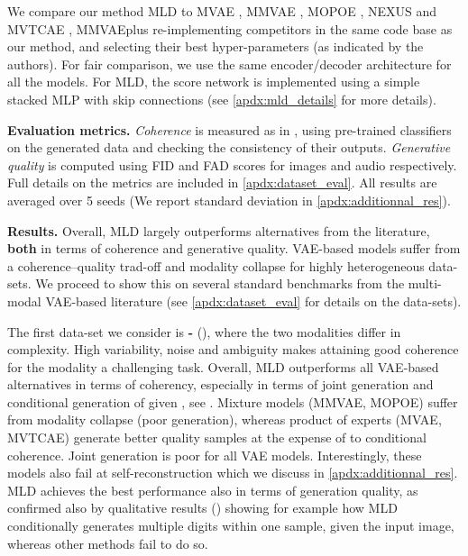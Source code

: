

We compare our method \gls{MLD} to \gls{MVAE} \cite{mvaeWu2018}, \gls{MMVAE} \cite{mmvaeShi2019}, \gls{MOPOE} \cite{sutter2021generalized}, \gls{NEXUS} \cite{Vasco2022} and \gls{MVTCAE} \cite{tcmvaehwang21}, \gls{MMVAEplus} \cite{palumbo2023mmvae} re-implementing competitors in the same code base as our method, and selecting their best hyper-parameters (as indicated by the authors). For fair comparison, we use the same encoder/decoder architecture for all the models. For \gls{MLD}, the score network is implemented using a simple stacked \gls{MLP} with skip connections (see \ref{apdx:mld_details} for more details).



\noindent \textbf{Evaluation metrics.} \textit{Coherence} is measured as in \cite{mmvaeShi2019, sutter2021generalized, palumbo2023mmvae}, using pre-trained classifiers on the generated data and checking the consistency of their outputs. \textit{Generative quality} is computed using \gls{FID} \cite{fid} and \gls{FAD} \cite{fad} scores for images and audio respectively. Full details on the metrics are included in \ref{apdx:dataset_eval}. All results are averaged over 5 seeds (We report standard deviation in \ref{apdx:additionnal_res}).





\noindent \textbf{Results.} Overall, \gls{MLD} largely outperforms alternatives from the literature, \textbf{both} in terms of coherence and generative quality. \gls{VAE}-based models suffer from a coherence--quality trad-off and modality collapse for highly heterogeneous data-sets. We proceed to show this on several standard benchmarks from the multi-modal \gls{VAE}-based literature (see \ref{apdx:dataset_eval} for details on the data-sets).



The first data-set we consider is \textbf{\mnist-\svhn} (\citep{mmvaeShi2019}), where the two modalities differ in complexity.  
High variability, noise and ambiguity makes attaining good coherence for the \svhn modality a challenging task. Overall, \gls{MLD} outperforms all \gls{VAE}-based alternatives in terms of coherency, especially in terms of joint generation and conditional generation of \mnist given \svhn, see . Mixture models (\gls{MMVAE}, \gls{MOPOE}) suffer from modality collapse (poor \svhn generation), whereas product of experts (\gls{MVAE}, \gls{MVTCAE}) generate better quality samples at the expense of \svhn to \mnist conditional coherence. Joint generation is poor for all \gls{VAE} models. Interestingly, these models also fail at \svhn self-reconstruction which we discuss in \ref{apdx:additionnal_res}. \gls{MLD} achieves the best performance also in terms of generation quality, as confirmed also by qualitative results () showing for example how \gls{MLD} conditionally generates multiple \svhn digits within one sample, given the input \mnist image, whereas other methods fail to do so. 








